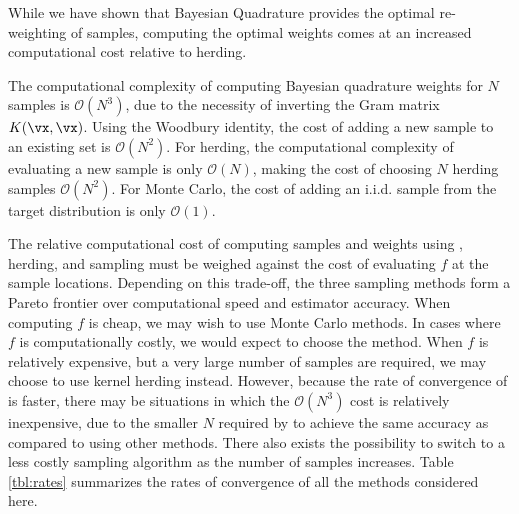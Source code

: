 While we have shown that Bayesian Quadrature provides the optimal re-weighting of samples, computing the optimal weights comes at an increased computational cost relative to herding. 

The computational complexity of computing Bayesian quadrature weights for $N$ samples is $\mathcal{O}(N^3)$, due to the necessity of inverting the Gram matrix $K(\vx, \vx)$. Using the Woodbury identity, the cost of adding a new sample to an existing set is $\mathcal{O}(N^2)$. For herding, the computational complexity of evaluating a new sample is only $\mathcal{O}(N)$, making the cost of choosing $N$ herding samples $\mathcal{O}(N^2)$. For Monte Carlo, the cost of adding an i.i.d. sample from the target distribution is only $\mathcal{O}(1)$.

The relative computational cost of computing samples and weights using \bq{}, herding, and sampling must be weighed against the cost of evaluating $f$ at the sample locations. Depending on this trade-off, the three sampling methods form a Pareto frontier over computational speed and estimator accuracy. When computing $f$ is cheap, we may wish to use Monte Carlo methods. In cases where $f$ is computationally costly, we would expect to choose the \sbq{} method. When $f$ is relatively expensive, but a very large number of samples are required, we may choose to use kernel herding instead. However, because the rate of convergence of \sbq{} is faster, there may be situations in which the $\mathcal{O}(N^3)$ cost is relatively inexpensive, due to the smaller $N$ required by \sbq{} to achieve the same accuracy as compared to using other methods. There also exists the possibility to switch to a less costly sampling algorithm as the number of samples increases. Table \ref{tbl:rates} summarizes the rates of convergence of all the methods considered here.